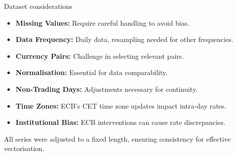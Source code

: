 \documentclass[aspectratio=169, 12pt]{beamer}
\begin{document}
\begin{frame}{Dataset considerations}
    \begin{itemize}
        \item \textbf{Missing Values:} Require careful handling to avoid bias.  
        \item \textbf{Data Frequency:} Daily data, resampling needed for other frequencies.
        \item \textbf{Currency Pairs:} Challenge in selecting relevant pairs.
        \item \textbf{Normalisation:} Essential for data comparability.
        \item \textbf{Non-Trading Days:} Adjustments necessary for continuity.
        \item \textbf{Time Zones:} ECB's CET time zone updates impact intra-day rates.
        \item \textbf{Institutional Bias:} ECB interventions can cause rate discrepancies.
    \end{itemize}

All series were adjusted to a fixed length, ensuring consistency for effective vectorisation.
\end{frame}
\end{document}
